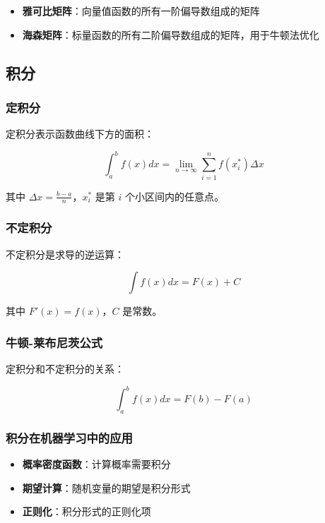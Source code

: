 \documentclass[12pt,UTF8]{ctexbook}
\begin{document}
\begin{itemize}[leftmargin=2cm]
    \item \textbf{雅可比矩阵}：向量值函数的所有一阶偏导数组成的矩阵
    \item \textbf{海森矩阵}：标量函数的所有二阶偏导数组成的矩阵，用于牛顿法优化
\end{itemize}

\subsection{积分}

\subsubsection{定积分}

定积分表示函数曲线下方的面积：

$$\int_{a}^{b} f(x) dx = \lim_{n \to \infty} \sum_{i=1}^{n} f(x_i^*) \Delta x$$

其中 $\Delta x = \frac{b-a}{n}$，$x_i^*$ 是第 $i$ 个小区间内的任意点。

\subsubsection{不定积分}

不定积分是求导的逆运算：

$$\int f(x) dx = F(x) + C$$

其中 $F'(x) = f(x)$，$C$ 是常数。

\subsubsection{牛顿-莱布尼茨公式}

定积分和不定积分的关系：

$$\int_{a}^{b} f(x) dx = F(b) - F(a)$$

\subsubsection{积分在机器学习中的应用}

\begin{itemize}[leftmargin=2cm]
    \item \textbf{概率密度函数}：计算概率需要积分
    \item \textbf{期望计算}：随机变量的期望是积分形式
    \item \textbf{正则化}：积分形式的正则化项
\end{itemize}
\end{document}
